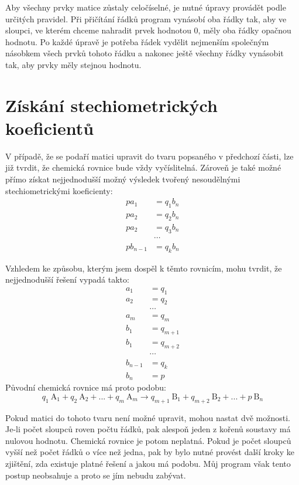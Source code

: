 \documentclass[12pt,a4paper]{report}
\newcommand{\n}[1]{\mbox{#1}}
\newcommand{\sipka}{\rightarrow}
\begin{document}
Aby všechny prvky matice zůstaly celočíselné, je nutné úpravy provádět podle určitých pravidel. Při přičítání řádků program vynásobí oba řádky tak, aby ve sloupci, ve kterém chceme nahradit prvek hodnotou 0, měly oba řádky opačnou hodnotu. Po každé úpravě je potřeba řádek vydělit nejmenším společným násobkem všech prvků tohoto řádku a nakonec ještě všechny řádky vynásobit tak, aby prvky  měly stejnou hodnotu.

\section{Získání stechiometrických koeficientů}
V případě, že se podaří matici upravit do tvaru popsaného v předchozí části, lze již tvrdit, že chemická rovnice bude vždy vyčíslitelná. Zároveň je také možné přímo získat nejjednodušší možný výsledek tvořený nesoudělnými stechiometrickými koeficienty:
\begin{align*}
	pa_1 &= q_1b_n\\
	pa_2 &= q_2b_n\\
	pa_2 &= q_3b_n\\
	     &\cdots \\
	pb_{n-1} &= q_kb_n
\end{align*}

Vzhledem ke způsobu, kterým jsem dospěl k těmto rovnicím, mohu tvrdit, že nejjednodušší řešení vypadá takto:
\begin{align*}
	a_1 &= q_1 \\
	a_2 &= q_2 \\
	&\cdots \\
	a_m &= q_m \\
	b_1 &= q_{m+1} \\
	b_1 &= q_{m+2} \\
	&\cdots \\
	b_{n-1} &= q_k \\
	b_n &= p
\end{align*}
Původní chemická rovnice má proto podobu:
$$q_1~\n{A}_1 + q_2~\n{A}_2 + ... + q_m~\n{A}_m \sipka q_{m+1}~\n{B}_1 + q_{m+2}~\n{B}_2 + ...+ p~\n{B}_n$$

Pokud matici do tohoto tvaru není možné upravit, mohou nastat dvě možnosti. Je-li počet sloupců roven počtu řádků, pak alespoň jeden z kořenů soustavy má nulovou hodnotu. Chemická rovnice je potom neplatná. Pokud je počet sloupců vyšší než počet řádků o více než jedna, pak by bylo nutné provést další kroky ke zjištění, zda existuje platné řešení a jakou má podobu. Můj program však tento postup neobsahuje a proto se jím nebudu zabývat.
\end{document}
